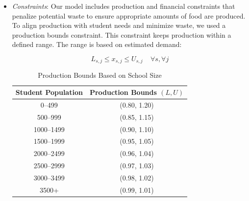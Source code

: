 \documentclass{scrartcl}
\begin{document}
\begin{itemize}
    \begin{equation}
        \text{Minimize Z} = \sum^n_{i=1}\sum^m_{j=1}(c_{ij} + \lambda w_{ij})x_{ij}
    \end{equation}

    While the waste penalty parameter ($\lambda$) was set to 0.1 to balance environmental and financial goals, this value lacks empirical grounding in actual disposal costs. As the model's optimal outputs fluctuate significantly based on this weight, the reported results are conditional on this specific setting. Future operators should adjust $\lambda$ to strictly align with their district's operational costs and environmental priorities.

    \item \textit{Constraints}: Our model includes production and financial constraints that penalize potential waste to ensure appropriate amounts of food are produced. To align production with student needs and minimize waste, we used a production bounds constraint. This constraint keeps production within a defined range. The range is based on estimated demand:

    \begin{equation}
        L_{s,j} \le x_{s,j} \le U_{s,j}  \ \ \ \ \ \forall s, \forall j
    \end{equation}

    \begin{table}[H]
        \centering
        \begin{tabular}{cc}
            \toprule
            \textbf{Student Population} & \textbf{Production Bounds $(L, U)$} \\
            \midrule
            0--499 & (0.80, 1.20) \\
            500--999 & (0.85, 1.15) \\
            1000--1499 & (0.90, 1.10) \\
            1500--1999 & (0.95, 1.05) \\
            2000--2499 & (0.96, 1.04) \\
            2500--2999 & (0.97, 1.03) \\
            3000--3499 & (0.98, 1.02) \\
            3500+ & (0.99, 1.01) \\
            \bottomrule
        \end{tabular}
        \caption{Production Bounds Based on School Size}
        \label{tab:production_bounds}
    \end{table}

\end{itemize}
\end{document}
